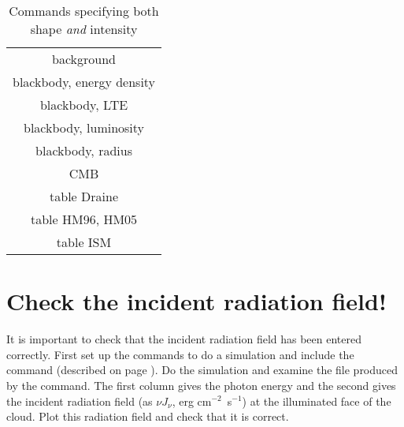 \begin{center}
\begin{table}
\centering
\caption{\label{tab:ShapeIntensityCommands}
Commands specifying both shape \emph{and} intensity}
\label{table:3}
\begin{tabular}{c}
\hline
background\\
 blackbody, energy density\\
blackbody, LTE\\
blackbody,
luminosity\\
blackbody, radius\\
CMB\\
table Draine\\
table HM96, HM05\\
table ISM\\
\hline
\end{tabular}
\end{table}
\end{center}

\section{Check the incident radiation field!}

It is important to check that the incident radiation field
has been entered correctly.
First set up the commands to do a simulation and include the  command
(described on page \pageref{sec:CommandSaveContinuum}).
Do the simulation and examine the
file produced by the  command.
The first column gives the
photon energy and the second gives the incident radiation field
(as $\nu J_{\nu}$, erg cm$^{-2}$~s$^{-1}$)
at the illuminated face of the cloud.
Plot this radiation field and check that it is correct.

